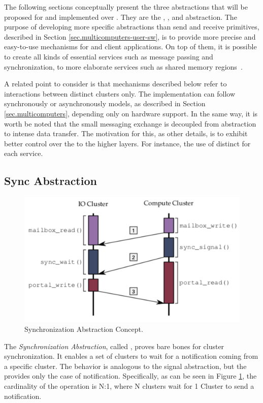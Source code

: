 	The following sections conceptually present the three abstractions
	that will be proposed for \hal and implemented over \mppa.
	They are the \sync, \mailbox, and \portal abstraction.
	The purpose of developing more specific abstractions than
	send and receive primitives, described in Section \ref{sec.multicomputers-user-sw},
	is to provide more precise and easy-to-use mechanisms for
	\os and client applications.
	On top of them, it is possible to create all kinds of essential
	services such as message passing and synchronization,
	to more elaborate services such as shared memory regions~\cite{penna:rmen}.

	A related point to consider is that mechanisms described below refer
	to interactions between distinct clusters only.
	The implementation can follow synchronously or asynchronously models,
	as described in Section \ref{sec.multicomputers}, depending only on hardware support.
	In the same way, it is worth be noted that the small messaging exchange
	is decoupled from abstraction to intense data transfer.
	The motivation for this, as other details, is to exhibit better control
	over the \qos to the higher layers.
	For instance, the use of distinct \nocs for each service.

		\subsection{Sync Abstraction}
		\label{sec.sync-abs}

			\begin{figure}[h]
				\centering
				\includegraphics[width=.7\textwidth]{images/conceptual-sync.png}

				\caption{
					Synchronization Abstraction Concept.
				}\par
				\label{fig.conpt_sync}
			\end{figure}

			The \textit{Synchronization Abstraction}, called \sync, proves bare bones
			for cluster synchronization.
			It enables a set of clusters to wait for a notification coming from a
			specific cluster.
			The behavior is analogous to the \posix signal abstraction, but the \sync
			provides only the case of notification.
			Specifically, as can be seen in Figure \ref{fig.conpt_sync}, the
			cardinality of the operation is N:1, where N clusters wait for 1 Cluster
			to send a notification.

